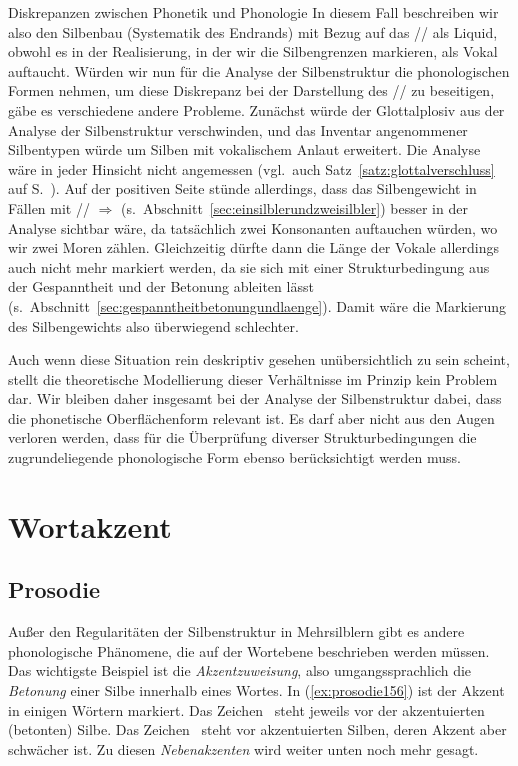 \begin{Vertiefung}{Diskrepanzen zwischen Phonetik und Phonologie}
In diesem Fall beschreiben wir also den Silbenbau (Systematik des Endrands) mit Bezug auf das // als Liquid, obwohl es in der Realisierung, in der wir die Silbengrenzen markieren, als Vokal \textipa{[@]} auftaucht.
Würden wir nun für die Analyse der Silbenstruktur die phonologischen Formen nehmen, um diese Diskrepanz bei der Darstellung des // zu beseitigen, gäbe es verschiedene andere Probleme.
Zunächst würde der Glottalplosiv \textipa{[P]} aus der Analyse der Silbenstruktur verschwinden, und das Inventar angenommener Silbentypen würde um Silben mit vokalischem Anlaut erweitert.
Die Analyse wäre in jeder Hinsicht nicht angemessen (vgl.\ auch Satz~\ref{satz:glottalverschluss} auf S.\ \pageref{satz:glottalverschluss}).
Auf der positiven Seite stünde allerdings, dass das Silbengewicht in Fällen mit // $\Rightarrow$ \textipa{[N]} (s.\ Abschnitt~\ref{sec:einsilblerundzweisilbler}) besser in der Analyse sichtbar wäre, da tatsächlich zwei Konsonanten auftauchen würden, wo wir zwei Moren zählen.
Gleichzeitig dürfte dann die Länge der Vokale allerdings auch nicht mehr markiert werden, da sie sich mit einer Strukturbedingung aus der Gespanntheit und der Betonung ableiten lässt (s.\ Abschnitt~\ref{sec:gespanntheitbetonungundlaenge}).
Damit wäre die Markierung des Silbengewichts also überwiegend schlechter.

Auch wenn diese Situation rein deskriptiv gesehen unübersichtlich zu sein scheint, stellt die theoretische Modellierung dieser Verhältnisse im Prinzip kein Problem dar.
Wir bleiben daher insgesamt bei der Analyse der Silbenstruktur dabei, dass die phonetische Oberflächenform relevant ist.
Es darf aber nicht aus den Augen verloren werden, dass für die Überprüfung diverser Strukturbedingungen die zugrundeliegende phonologische Form ebenso berücksichtigt werden muss.

\end{Vertiefung}

\section{Wortakzent}
\label{sec:wortakzent}

\subsection{Prosodie}
\label{sec:prosodie}


Außer den Regularitäten der Silbenstruktur in Mehrsilblern gibt es andere phonologische Phänomene, die auf der Wortebene beschrieben werden müssen.
Das wichtigste Beispiel ist die \textit{Akzentzuweisung}, also umgangssprachlich die \textit{Betonung} einer Silbe innerhalb eines Wortes.
In (\ref{ex:prosodie156}) ist der Akzent in einigen Wörtern markiert.
Das Zeichen \Akz\ steht jeweils vor der akzentuierten (betonten) Silbe.
Das Zeichen \Nakz\ steht vor akzentuierten Silben, deren Akzent aber schwächer ist.
Zu diesen \textit{Nebenakzenten} wird weiter unten noch mehr gesagt.

